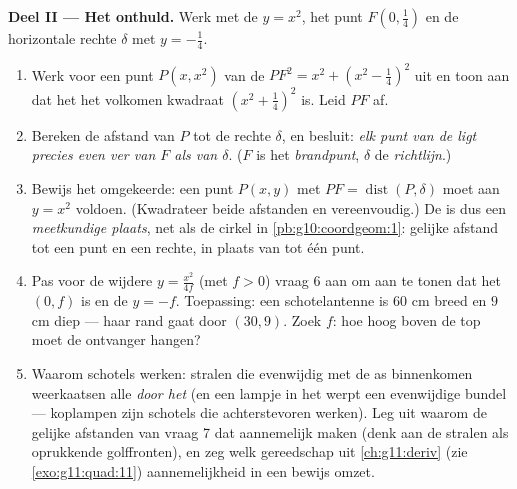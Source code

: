 \begin{problem}
\medskip
\noindent\textbf{Deel II --- Het  onthuld.}
Werk met de  $y = x^2$, het punt $F\left(0, \frac14\right)$ en de
horizontale rechte $\delta$ met  $y = -\frac14$.
\begin{enumerate}[resume]
  \item Werk voor een punt $P(x, x^2)$ van de 
        $PF^2 = x^2 + \left(x^2 - \frac14\right)^2$ uit en toon aan dat het
        het volkomen kwadraat $\left(x^2 + \frac14\right)^2$ is. Leid $PF$
        af.
  \item Bereken de afstand van $P$ tot de rechte $\delta$, en besluit:
        \emph{elk punt van de  ligt precies even ver van $F$ als van
        $\delta$}. ($F$ is het \emph{brandpunt}, $\delta$ de
        \emph{richtlijn}.)
  \item Bewijs het omgekeerde: een punt $P(x, y)$ met
        $PF = \operatorname{dist}(P, \delta)$ moet aan $y = x^2$ voldoen.
        (Kwadrateer beide afstanden en vereenvoudig.) De  is dus een
        \emph{meetkundige plaats}, net als de cirkel in
        \cref{pb:g10:coordgeom:1}: gelijke afstand tot een punt en een
        rechte, in plaats van tot één punt.
  \item Pas voor de wijdere  $y = \frac{x^2}{4f}$ (met $f > 0$)
        vraag 6 aan om aan te tonen dat het  $(0, f)$ is en de
         $y = -f$. Toepassing: een schotelantenne is $60$ cm breed
        en $9$ cm diep --- haar rand gaat door $(30, 9)$. Zoek $f$: hoe hoog
        boven de top moet de ontvanger hangen?
  \item Waarom schotels werken: stralen die evenwijdig met de as binnenkomen
        weerkaatsen alle \emph{door het } (en een lampje in het
         werpt een evenwijdige bundel --- koplampen zijn schotels die
        achterstevoren werken). Leg uit waarom de gelijke afstanden van vraag
        7 dat aannemelijk maken (denk aan de stralen als oprukkende
        golffronten), en zeg welk gereedschap uit \cref{ch:g11:deriv} (zie
        \cref{exo:g11:quad:11}) aannemelijkheid in een bewijs omzet.
\end{enumerate}


\end{problem}
